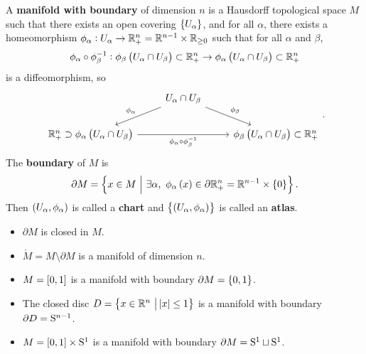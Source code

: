 \begin{definition}
A \textbf{manifold with boundary} of dimension $ n $ is a Hausdorff topological space $ M $ such that there exists an open covering $ \cbr{U_\alpha} $, and for all $ \alpha $, there exists a homeomorphism $ \phi_\alpha : U_\alpha \to \RR_+^n = \RR^{n - 1} \times \RR_{\ge 0} $ such that for all $ \alpha $ and $ \beta $,
$$ \phi_\alpha \circ \phi_\beta^{-1} : \phi_\beta\br{U_\alpha \cap U_\beta} \subset \RR_+^n \to \phi_\alpha\br{U_\alpha \cap U_\beta} \subset \RR_+^n $$
is a diffeomorphism, so
$$
\begin{tikzcd}
& U_\alpha \cap U_\beta \arrow[swap]{dl}{\phi_\alpha} \arrow{dr}{\phi_\beta} & \\
\RR_+^n \supset \phi_\alpha\br{U_\alpha \cap U_\beta} \arrow[swap]{rr}{\phi_\alpha \circ \phi_\beta^{-1}} & & \phi_\beta\br{U_\alpha \cap U_\beta} \subset \RR_+^n
\end{tikzcd}.
$$
The \textbf{boundary} of $ M $ is
$$ \partial M = \cbr{x \in M \st \exists \alpha, \ \phi_\alpha\br{x} \in \partial\RR_+^n = \RR^{n - 1} \times \cbr{0}}. $$
Then $ \br{U_\alpha, \phi_\alpha} $ is called a \textbf{chart} and $ \cbr{\br{U_\alpha, \phi_\alpha}} $ is called an \textbf{atlas}.
\end{definition}

\begin{remark}
\hfill
\begin{itemize}
\item $ \partial M $ is closed in $ M $.
\item $ \mathring{M} = M \setminus \partial M $ is a manifold of dimension $ n $.
\end{itemize}
\end{remark}

\begin{example}
\hfill
\begin{itemize}
\item $ M = \sbr{0, 1} $ is a manifold with boundary $ \partial M = \cbr{0, 1} $.
\item The closed disc $ D = \cbr{x \in \RR^n \st \abs{x} \le 1} $ is a manifold with boundary $ \partial D = \S^{n - 1} $.
\item $ M = \sbr{0, 1} \times \S^1 $ is a manifold with boundary $ \partial M = \S^1 \sqcup \S^1 $.
\end{itemize}
\end{example}

